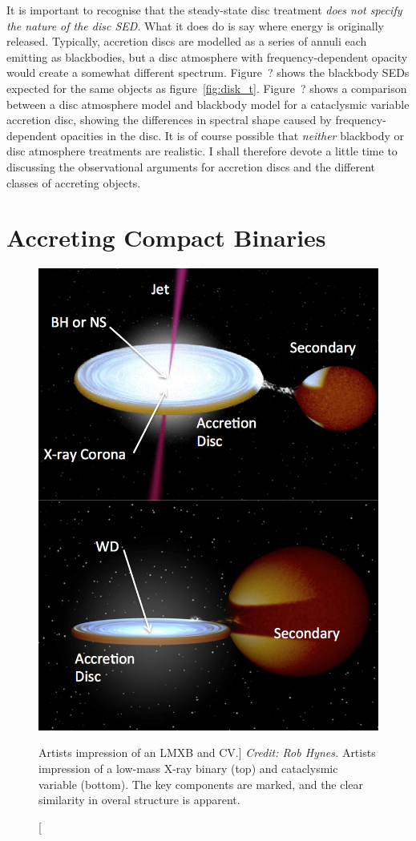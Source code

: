 It is important to recognise that the steady-state disc treatment
{\sl does not specify the nature of the disc SED}. What it does do is 
say where energy is originally released. Typically,
accretion discs are modelled as a series of annuli each emitting 
as blackbodies, but a disc atmosphere with frequency-dependent
opacity would create a somewhat different spectrum. 
Figure~? shows the blackbody SEDs expected for the same objects as figure~\ref{fig:disk_t}.
Figure~? shows a comparison between a disc atmosphere model and
blackbody model for a cataclysmic variable accretion disc, showing
the differences in spectral shape caused by frequency-dependent opacities
in the disc. It is of course possible that {\em neither} blackbody or disc atmosphere
treatments are realistic. I shall therefore devote a little time to discussing
the observational arguments for accretion discs and the different classes of accreting 
objects.


\section{Accreting Compact Binaries}

\begin{figure}
\centering
\includegraphics[width=1.0\textwidth]{figures/01-intro/cv_and_xrb.png}
\caption
[Artists impression of an LMXB and CV.]
{
{\sl Credit: Rob Hynes.} 
Artists impression of a low-mass X-ray binary (top) and
cataclysmic variable (bottom). The key components are marked,
and the clear similarity in overal structure is apparent.
} 
\label{fig:cv_and_xrb}
\end{figure}

